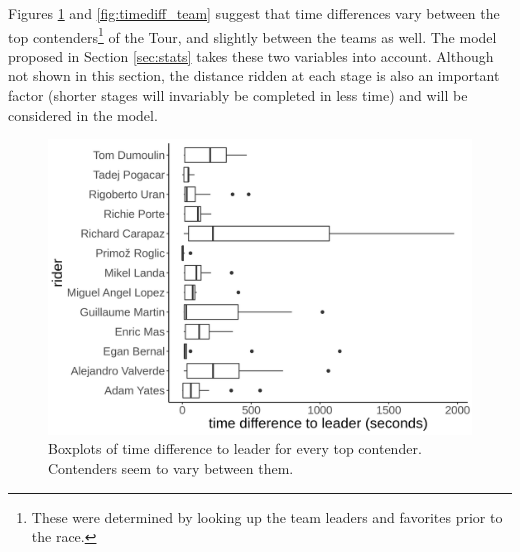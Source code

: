 \documentclass[aos,preprint]{imsart}
\begin{document}

Figures \ref{fig:timediff_contender} and \ref{fig:timediff_team} suggest that time differences vary between the top contenders\footnote{These were determined by looking up the team leaders and favorites prior to the race.} of the Tour, and slightly between the teams as well. The model proposed in Section \ref{sec:stats} takes these two variables into account. Although not shown in this section, the distance ridden at each stage is also an important factor (shorter stages will invariably be completed in less time) and will be considered in the model.


\begin{figure}[h]
  \centering
  \includegraphics[scale=0.5]{fig/timediff_contender.png}
  \caption{Boxplots of time difference to leader for every top contender. Contenders seem to vary between them.}
  \label{fig:timediff_contender}
\end{figure}
\end{document}
